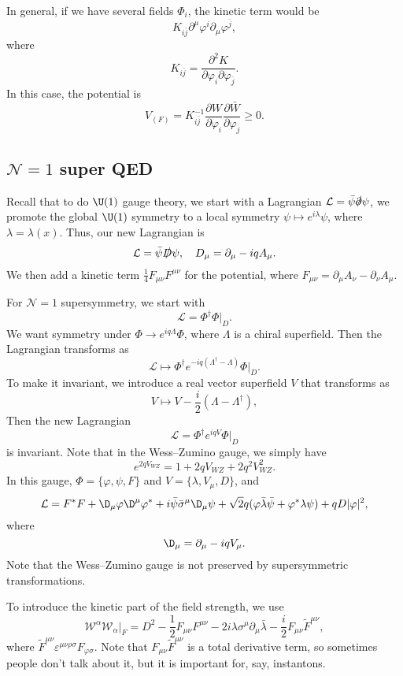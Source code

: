 \documentclass[a4paper]{article}
\begin{document}
In general, if we have several fields $\Phi_i$, the kinetic term would be
\[
  K_{i\bar{j}} \partial^\mu\varphi^i \partial_\mu \varphi^{\bar{j}},
\]
where
\[
  K_{i\bar{j}} = \frac{\partial^2 K}{\partial \varphi_i \partial \varphi_{\bar{j}}}.
\]
In this case, the potential is
\[
  V_{(F)} = K_{i\bar{j}}^{-1} \frac{\partial W}{\partial \varphi_i} \frac{\partial \bar{W}}{\partial \varphi_{\bar{j}}} \geq 0.
\]
\subsection{\texorpdfstring{$\mathcal{N} = 1$}{N = 1} super QED}
Recall that to do $\U(1)$ gauge theory, we start with a Lagrangian $\mathcal{L} = \bar{\psi} \slashed\partial \psi$, we promote the global $\U(1)$ symmetry to a local symmetry $\psi \mapsto e^{i \lambda} \psi$, where $\lambda = \lambda(x)$. Thus, our new Lagrangian is
\[
  \mathcal{L} = \bar{\psi} \slashed{D} \psi,\quad D_\mu = \partial_\mu - i q A_\mu.
\]
We then add a kinetic term $\frac{1}{4} F_{\mu\nu} F^{\mu\nu}$ for the potential, where $F_{\mu\nu} = \partial_\mu A_\nu - \partial_\nu A_\mu$.

For $\mathcal{N} = 1$ supersymmetry, we start with
\[
  \mathcal{L} = \Phi^\dagger \Phi|_D.
\]
We want symmetry under $\Phi \to e^{i q \Lambda} \Phi$, where $\Lambda$ is a chiral superfield. Then the Lagrangian transforms as
\[
  \mathcal{L} \mapsto \Phi^\dagger e^{-i q (\Lambda^\dagger - \Lambda)} \Phi|_D.
\]
To make it invariant, we introduce a real vector superfield $V$ that transforms as
\[
  V \mapsto V - \frac{i}{2} (\Lambda - \Lambda^\dagger),
\]
Then the new Lagrangian
\[
  \mathcal{L} = \Phi^\dagger e^{iqV} \Phi|_D
\]
is invariant. Note that in the Wess--Zumino gauge, we simply have
\[
  e^{2qV_{WZ}} = 1 + 2qV_{WZ} + 2q^2 V_{WZ}^2.
\]
In this gauge, $\Phi= \{ \varphi, \psi, F\}$ and $V = \{\lambda, V_\mu, D\}$, and
\[
  \mathcal{L} = F^* F + \D_\mu \varphi \D^\mu \varphi^* + i \bar{\psi} \bar{\sigma}^\mu \D_\mu \psi + \sqrt{2} q(\varphi \bar{\lambda} \bar{\psi} + \varphi^* \lambda \psi) + q D |\varphi|^2,
\]
where
\[
  \D_\mu = \partial_\mu - i q V_\mu.
\]
Note that the Wess--Zumino gauge is not preserved by supersymmetric transformations.

To introduce the kinetic part of the field strength, we use
\[
  \mathcal{W}^\alpha \mathcal{W}_\alpha|_F = D^2 - \frac{1}{2} F_{\mu\nu} F^{\mu\nu} - 2i \lambda \sigma^\mu \partial_\mu \bar{\lambda} - \frac{i}{2} F_{\mu\nu} \tilde{F}^{\mu\nu},
\]
where $\tilde{F}^{\mu\nu} \varepsilon^{\mu\nu\rho\sigma} F_{\varphi \sigma}$. Note that $F_{\mu\nu} \tilde{F}^{\mu\nu}$ is a total derivative term, so sometimes people don't talk about it, but it is important for, say, instantons. %
\end{document}
